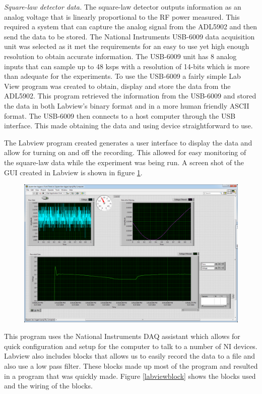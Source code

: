 \emph{Square-law detector data.}  The square-law detector outputs information as an analog voltage that is linearly proportional to the RF power measured.  This required a system that can capture the analog signal from the ADL5902 and then send the data to be stored.  The National Instruments USB-6009 data acquisition unit was selected as it met the requirements for an easy to use yet high enough resolution to obtain accurate information.  The USB-6009 unit has 8 analog inputs that can sample up to 48 ksps with a resolution of 14-bits which is more than adequate for the experiments.  To use the USB-6009 a fairly simple Lab View program was created to obtain, display and store the data from the ADL5902.  This program retrieved the information from the USB-6009 and stored the data in both Labview's binary format and in a more human friendly ASCII format.  The USB-6009 then connects to a host computer through the USB interface.  This made obtaining the data and using device straightforward to use.

The Labview program created generates a user interface to display the data and allow for turning on and off the recording.  This allowed for easy monitoring of the square-law data while the experiment was being run.  A screen shot of the GUI created in Labview is shown in figure \ref{labviewgui}.

{\begin{figure}[h!tb] \centering
\includegraphics[width=\textwidth]{Images/labviewGUI.png}
\label{labviewgui}
\end{figure}
}

This program uses the National Instruments DAQ assistant which allows for quick configuration and setup for the computer to talk to a number of NI devices.  Labview also includes blocks that allows us to easily record the data to a file and also use a low pass filter.  These blocks made up most of the program and resulted in a program that was quickly made.  Figure \ref{labviewblock} shows the blocks used and the wiring of the blocks.

